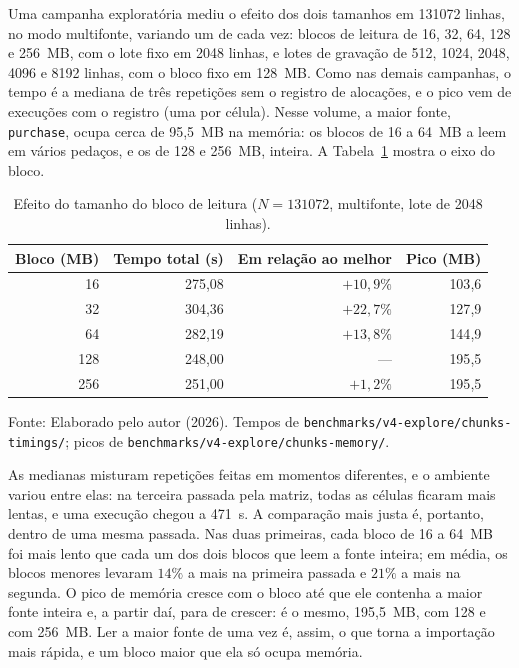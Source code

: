 Uma campanha exploratória mediu o efeito dos dois tamanhos em \num{131072} linhas, no modo
multifonte, variando um de cada vez: blocos de leitura de 16, 32, 64, 128 e 256~MB, com o
lote fixo em \num{2048} linhas, e lotes de gravação de 512, \num{1024}, \num{2048},
\num{4096} e \num{8192} linhas, com o bloco fixo em 128~MB. Como nas demais campanhas, o
tempo é a mediana de três repetições sem o registro de alocações, e o pico vem de execuções
com o registro (uma por célula). Nesse volume, a maior fonte, \texttt{purchase}, ocupa
cerca de 95{,}5~MB na memória: os blocos de 16 a 64~MB a leem em vários pedaços, e os de 128
e 256~MB, inteira. A Tabela~\ref{tab:qp5-bloco} mostra o eixo do bloco.

\begin{table}[H]
  \caption{Efeito do tamanho do bloco de leitura ($N = \num{131072}$, multifonte, lote de \num{2048} linhas).}
  \label{tab:qp5-bloco}
  \centering
  \begin{tabular}{r r r r}
    \toprule
    \textbf{Bloco (MB)} & \textbf{Tempo total (s)} & \textbf{Em relação ao melhor} & \textbf{Pico (MB)} \\
    \midrule
     16 & 275{,}08 & $+10{,}9\%$ & 103{,}6 \\
     32 & 304{,}36 & $+22{,}7\%$ & 127{,}9 \\
     64 & 282{,}19 & $+13{,}8\%$ & 144{,}9 \\
    128 & 248{,}00 & ---         & 195{,}5 \\
    256 & 251{,}00 & $+1{,}2\%$  & 195{,}5 \\
    \bottomrule
  \end{tabular}
  \par\vspace{4pt}
  {\footnotesize Fonte: Elaborado pelo autor (2026). Tempos de \texttt{benchmarks/v4-explore/chunks-timings/}; picos de \texttt{benchmarks/v4-explore/chunks-memory/}.}
\end{table}

As medianas misturam repetições feitas em momentos diferentes, e o ambiente variou entre
elas: na terceira passada pela matriz, todas as células ficaram mais lentas, e uma execução
chegou a 471~s. A comparação mais justa é, portanto, dentro de uma mesma passada. Nas duas
primeiras, cada bloco de 16 a 64~MB foi mais lento que cada um dos dois blocos que leem a
fonte inteira; em média, os blocos menores levaram $14\%$ a mais na primeira passada e $21\%$
a mais na segunda. O pico de memória cresce com o bloco até que ele contenha a maior fonte
inteira e, a partir daí, para de crescer: é o mesmo, 195{,}5~MB, com 128 e com 256~MB. Ler
a maior fonte de uma vez é, assim, o que torna a importação mais rápida, e um bloco maior
que ela só ocupa memória.

